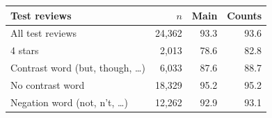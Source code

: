 \begin{tabular}{@{}lrrr@{}}
\toprule
Test reviews & $n$ & Main & Counts \\
\midrule
All test reviews & 24,362 & 93.3 & 93.6 \\
4 stars & 2,013 & 78.6 & 82.8 \\
Contrast word (but, though, \ldots) & 6,033 & 87.6 & 88.7 \\
No contrast word & 18,329 & 95.2 & 95.2 \\
Negation word (not, n't, \ldots) & 12,262 & 92.9 & 93.1 \\
\bottomrule
\end{tabular}
